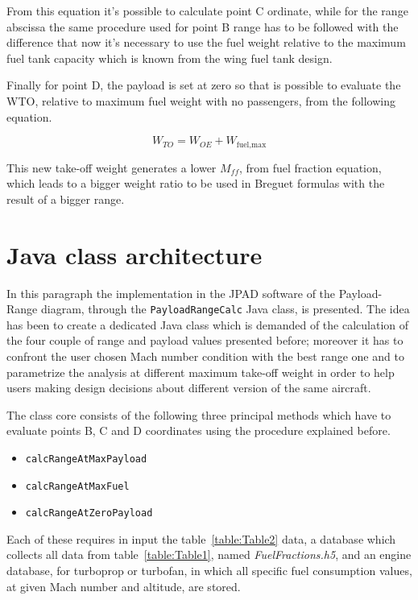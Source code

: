 \bigskip
\noindent
From this equation it’s possible to calculate point C ordinate, while for the range abscissa the same procedure used for point B range has to be followed with the difference that now it’s necessary to use the fuel weight relative to the maximum fuel tank capacity which is known from the wing fuel tank design.
  
Finally for point D, the payload is set at zero so that is possible to evaluate the WTO, relative to maximum fuel weight with no passengers, from the following equation.

\begin{equation}
W_{TO}=W_{OE}+W_{\text{fuel,max}}
\label{eqn:Equation1.7}
\end{equation}

\bigskip
\noindent
This new take-off weight generates a lower $M_{ff}$, from fuel fraction equation, which leads to a bigger weight ratio to be used in Breguet formulas with the result of a bigger range.

\bigskip
\section{Java class architecture}
In this paragraph the implementation in the JPAD software of the Payload-Range diagram, through the \lstinline[language=Java]!PayloadRangeCalc! Java class, is presented. The idea has been to create a dedicated Java class which is demanded of the calculation of the four couple of range and payload values presented before; moreover it has to confront the user chosen Mach number condition with the best range one and to parametrize the analysis at different maximum take-off weight in order to help users making design decisions about different version of the same aircraft.

The class core consists of the following three principal methods which have to evaluate points B, C and D coordinates using the procedure explained before.

\begin{itemize}
\item\lstinline[language=Java]!calcRangeAtMaxPayload!
\item\lstinline[language=Java]!calcRangeAtMaxFuel!
\item\lstinline[language=Java]!calcRangeAtZeroPayload!
\end{itemize}

\bigskip
\noindent
Each of these requires in input the table~\ref{table:Table2} data, a database which collects all data from table~\ref{table:Table1},  named \emph{FuelFractions.h5}, and an engine database, for turboprop or turbofan, in which all specific fuel consumption values, at given Mach number and altitude, are stored.

